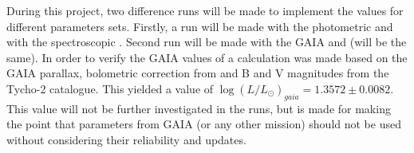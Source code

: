 During this project, two difference runs will be made to implement the values for different parameters sets. Firstly, a run will be made with the \citet{lenz2010delta} photometric \teff and \lum with the spectroscopic \logg. Second run will be made with the GAIA \teff and \lum (\logg will be the same). In order to verify the GAIA values of \lum a calculation was made based on the GAIA parallax, bolometric correction from \citet{Flower96} and B and V magnitudes from the Tycho-2 catalogue. This yielded a value of $\log (L/L_\odot)_{gaia} = 1.3572 \pm 0.0082$. This value will not be further investigated in the runs, but is made for making the point that parameters from GAIA (or any other mission) should not be used without considering their reliability and updates. 



%
%
%
%
%



